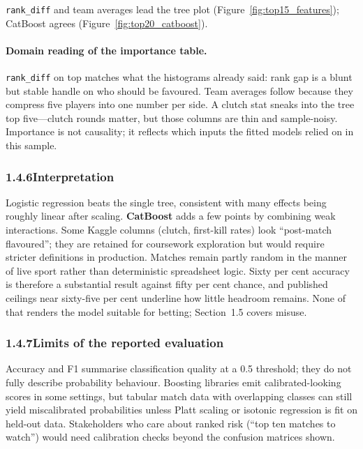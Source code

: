 \documentclass[12pt,a4paper]{article}
\begin{document}
\texttt{rank\_diff} and team averages lead the tree plot (Figure~\ref{fig:top15_features}); CatBoost agrees (Figure~\ref{fig:top20_catboost}).

\paragraph{Domain reading of the importance table.}
\texttt{rank\_diff} on top matches what the histograms already said: rank gap is a blunt but stable handle on who should be favoured. Team averages follow because they compress five players into one number per side. A clutch stat sneaks into the tree top five---clutch rounds matter, but those columns are thin and sample-noisy. Importance is not causality; it reflects which inputs the fitted models relied on in this sample.

\subsubsection{1.4.6\quad Interpretation}

Logistic regression beats the single tree, consistent with many effects being roughly linear after scaling. \textbf{CatBoost} adds a few points by combining weak interactions. Some Kaggle columns (clutch, first-kill rates) look ``post-match flavoured''; they are retained for coursework exploration but would require stricter definitions in production. Matches remain partly random in the manner of live sport rather than deterministic spreadsheet logic. Sixty per cent accuracy is therefore a substantial result against fifty per cent chance, and published ceilings near sixty-five per cent underline how little headroom remains. None of that renders the model suitable for betting; Section~1.5 covers misuse.

\subsubsection{1.4.7\quad Limits of the reported evaluation}

Accuracy and F1 summarise classification quality at a 0.5 threshold; they do not fully describe probability behaviour. Boosting libraries emit calibrated-looking scores in some settings, but tabular match data with overlapping classes can still yield miscalibrated probabilities unless Platt scaling or isotonic regression is fit on held-out data. Stakeholders who care about ranked risk (``top ten matches to watch'') would need calibration checks beyond the confusion matrices shown.
\end{document}
